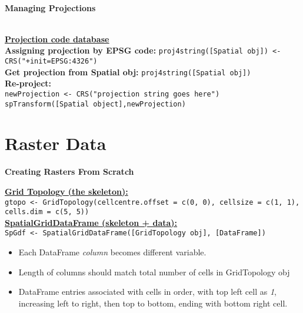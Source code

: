 \documentclass[10pt]{article}
\begin{document}

\hrulefill \\ 
\centerline{\textbf{Managing Projections}} \\
\href{http://www.spatialreference.org/}{\underline{\textbf{Projection code database}}} \\
\hspace{0.3cm}
\textbf{Assigning projection by EPSG code:} \texttt{proj4string([Spatial obj]) <-CRS("+init=EPSG:4326")}\\
\textbf{Get projection from Spatial obj:} \texttt{proj4string([Spatial obj])} \\
\textbf{Re-project:} \\
\hspace*{0.3cm}\texttt{newProjection <- CRS("projection string goes here")}\\
\hspace*{0.3cm}\texttt{spTransform([Spatial object],newProjection)}\\


\section*{Raster Data}



\centerline{\textbf{Creating Rasters From Scratch}} 

\underline{\textbf{Grid Topology (the skeleton):}}\\
\hspace*{0.3cm}\texttt{gtopo <- GridTopology(cellcentre.offset = c(0, 0), cellsize = c(1, 1), cells.dim = c(5, 5))}\\
\underline{\textbf{SpatialGridDataFrame (skeleton + data):}}\\
\hspace*{0.3cm}\texttt{SpGdf <- SpatialGridDataFrame([GridTopology obj], [DataFrame])}
\begin{itemize}
	\item Each DataFrame \emph{column} becomes different variable. 
	\item Length of columns should match total number of cells in GridTopology obj
	\item DataFrame entries associated with cells in order, with top left cell as \emph{1}, increasing left to right, then top to bottom, ending with bottom right cell. 
\end{itemize}


\end{document}
